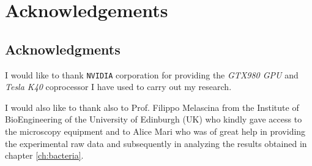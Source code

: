 
\bigskip

\begingroup
\let\clearpage\relax
\let\cleardoublepage\relax
\let\cleardoublepage\relax
\chapter*{Acknowledgements}

\def\thanks#1{%
\begingroup
\leftskip1em
\noindent #1
\par
\endgroup
}

\section*{Acknowledgments}
I would like to thank \texttt{NVIDIA} corporation for providing the \textit{GTX980 GPU}
and \textit{Tesla K40} coprocessor I have used to carry out my research.

I would also like to thank also to Prof. Filippo Melascina from the Institute of BioEngineering of the University of Edinburgh (UK) who kindly gave access to the microscopy equipment and to Alice Mari who was of great help in providing the experimental raw data and subsequently in analyzing the results obtained in chapter \ref{ch:bacteria}.


\endgroup
